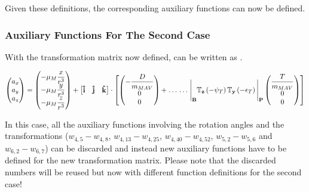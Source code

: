 \noindent
Given these definitions, the corresponding auxiliary functions can now be defined. 

\subsubsection{Auxiliary Functions For The Second Case}
\label{subsubsec:auxFsecCase}
With the transformation matrix now defined,  can be written as .

\begin{equation} \label{eq:accAlTrans}
\begin{pmatrix}
a_{x}\\
a_{y}\\
a_{z}\\
\end{pmatrix}
=
\begin{pmatrix}
-\mu_{M}\dfrac{x}{r^{3}}\\
-\mu_{M}\dfrac{y}{r^{3}}\\
-\mu_{M}\dfrac{z}{r^{3}}\\
\end{pmatrix}+
\left[
\begin{matrix}
\mathbf{\hat{i}} & \mathbf{\hat{j}} & \mathbf{\hat{k}} \\
\end{matrix}
\right]
\cdot
\left[
\begin{pmatrix}
-\dfrac{D}{m_{MAV}}\\
0\\
0\\
\end{pmatrix}
+  \right. \dots \\
\dotsc
 \left.
\Bigg|_{\mathbf{B}}\mathbb{T}_{\mathbf{z}}\left(-\psi_{T}\right)\mathbb{T}_{\mathbf{y}}\left(-\epsilon_{T}\right)\Bigg|_{\mathbf{P}}
\begin{pmatrix}
\dfrac{T}{m_{MAV}}\\
0\\
0\\
\end{pmatrix}
\right]
\end{equation}

\noindent
In this case, all the auxiliary functions involving the rotation angles and the transformations ($w_{4,5}-w_{4,8}$, $w_{4,13}-w_{4,25}$, $w_{4,40}-w_{4,52}$, $w_{5,2}-w_{5,6}$ and $w_{6,2}-w_{6,7}$) can be discarded and instead new auxiliary functions have to be defined for the new transformation matrix. Please note that the discarded numbers will be reused but now with different function definitions for the second case!

